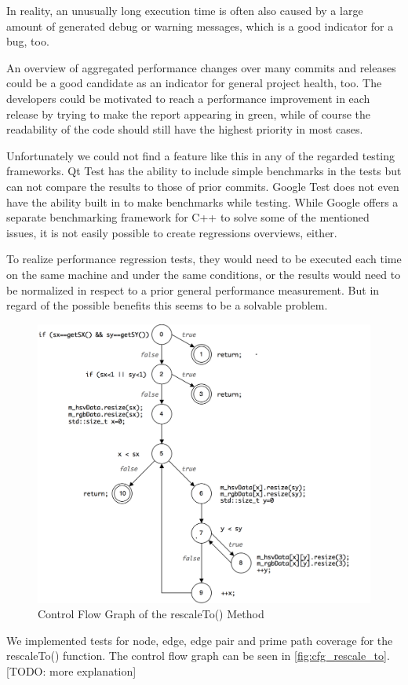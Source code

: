 \documentclass{scrreprt}
\begin{document}
In reality, an unusually long execution time is often also caused by a large amount of generated debug or warning messages, which is a good indicator for a bug, too.

An overview of aggregated performance changes over many commits and releases could be a good candidate as an indicator for general project health, too. The developers could be motivated to reach a performance improvement in each release by trying to make the report appearing in green, while of course the readability of the code should still have the highest priority in most cases.

Unfortunately we could not find a feature like this in any of the regarded testing frameworks. Qt Test has the ability to include simple benchmarks in the tests but can not compare the results to those of prior commits. Google Test does not even have the ability built in to make benchmarks while testing. While Google offers a separate benchmarking framework for C++ to solve some of the mentioned issues, it is not easily possible to create regressions overviews, either.

To realize performance regression tests, they would need to be executed each time on the same machine and under the same conditions, or the results would need to be normalized in respect to a prior general performance measurement. But in regard of the possible benefits this seems to be a solvable problem.



\begin{figure}[h]
	\centering
	\includegraphics[width=1.0\textwidth]{img/cfg_rescale_to}
	\caption[Control Flow Graph rescaleTo()]{Control Flow Graph of the rescaleTo() Method}
	\label{fig:cfg_rescale_to}
\end{figure}

We implemented tests for node, edge, edge pair and prime path coverage for the rescaleTo() function. The control flow graph can be seen in \vref{fig:cfg_rescale_to}. [TODO: more explanation]
\end{document}
